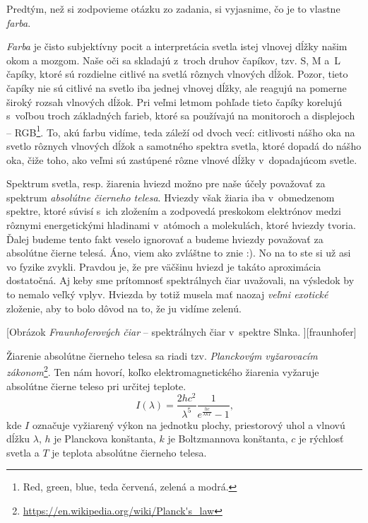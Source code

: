 Predtým, než si zodpovieme otázku zo zadania, si vyjasnime, čo je to vlastne \emph{farba}. 

\emph{Farba} je čisto subjektívny pocit a interpretácia svetla istej vlnovej dĺžky našim okom a mozgom.
Naše oči sa skladajú z~troch druhov čapíkov, tzv. S, M a~L čapíky, ktoré sú rozdielne citlivé na svetlá rôznych vlnových dĺžok.
Pozor, tieto čapíky nie sú citlivé na svetlo iba jednej vlnovej dĺžky, ale reagujú na pomerne široký rozsah vlnových dĺžok.
Pri veľmi letmom pohľade tieto čapíky korelujú s~voľbou troch základných farieb, ktoré sa používajú na monitoroch a displejoch -- RGB\footnote{Red, green, blue, teda červená, zelená a modrá.}.
To, akú farbu vidíme, teda záleží od dvoch vecí: citlivosti nášho oka na svetlo rôznych vlnových dĺžok a samotného spektra svetla,
ktoré dopadá do nášho oka, čiže toho, ako veľmi sú zastúpené rôzne vlnové dĺžky v~dopadajúcom svetle.

Spektrum svetla, resp. žiarenia hviezd možno pre naše účely považovať za spektrum \emph{absolútne čierneho telesa}.
Hviezdy však žiaria iba v~obmedzenom spektre, ktoré súvisí s~ich zložením a zodpovedá preskokom 
elektrónov medzi rôznymi energetickými hladinami v~atómoch a molekulách, ktoré hviezdy tvoria.
Ďalej budeme tento fakt veselo ignorovať a budeme hviezdy považovať za absolútne čierne telesá. Áno, viem ako zvláštne to znie :). No na to ste si už asi vo fyzike zvykli. Pravdou je, že pre väčšinu hviezd je takáto aproximácia dostatočná.
Aj keby sme prítomnosť spektrálnych čiar uvažovali, na výsledok by to nemalo veľký vplyv.
Hviezda by totiž musela mať naozaj \emph{veľmi exotické} zloženie, aby to bolo dôvod na to, že ju vidíme zelenú. 

[Obrázok \emph{Fraunhoferových čiar} -- spektrálnych čiar v~spektre Slnka.%
][fraunhofer]

Žiarenie absolútne čierneho telesa sa riadi tzv. \emph{Planckovým vyžarovacím zákonom}\footnote{\url{https://en.wikipedia.org/wiki/Planck's_law}}.
Ten nám hovorí, koľko elektromagnetického žiarenia vyžaruje absolútne čierne teleso pri určitej teplote. 
$$
I(\lambda) = \frac{2hc^2}{\lambda^5}\frac{1}{e^{\frac{hc}{\lambda k T}}-1}\text{,}
$$
kde $I$ označuje vyžiarený výkon na jednotku plochy, priestorový uhol a vlnovú dĺžku $\lambda$, $h$ je Planckova konštanta, $k$ je Boltzmannova konštanta, $c$ je rýchlosť svetla a $T$ je teplota absolútne čierneho telesa.

